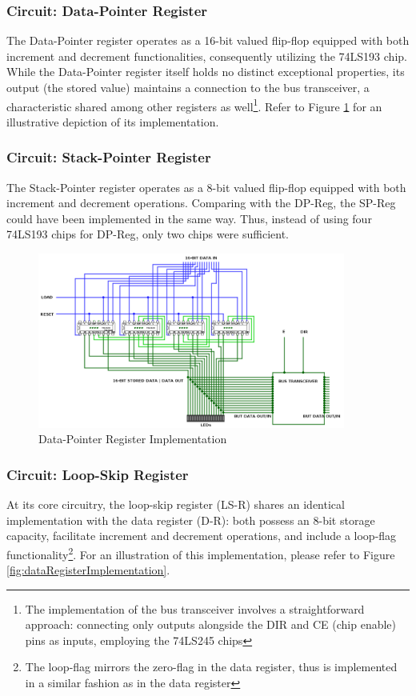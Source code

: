 \subsubsection{Circuit: Data-Pointer Register} \label{sec:implementation:registers:dpreg}
The Data-Pointer register operates as a 16-bit valued flip-flop equipped with both increment and decrement functionalities, consequently utilizing the 74LS193 chip. While the Data-Pointer register itself holds no distinct exceptional properties, its output (the stored value) maintains a connection to the bus transceiver, a characteristic shared among other registers as well\footnote{The implementation of the bus transceiver involves a straightforward approach: connecting only outputs alongside the DIR and CE (chip enable) pins as inputs, employing the 74LS245 chips}. Refer to Figure \ref{fig:dataPointerRegisterImplementation} for an illustrative depiction of its implementation.

\subsubsection{Circuit: Stack-Pointer Register} \label{sec:implementation:registers:spreg}
The Stack-Pointer register operates as a 8-bit valued flip-flop equipped with both increment and decrement operations. Comparing with the DP-Reg, the SP-Reg could have been implemented in the same way. Thus, instead of using four 74LS193 chips for DP-Reg, only two chips were sufficient. 


\begin{figure}[H]
	\centering
	\includegraphics[width=0.9\textwidth]{img/data_pointer_register_implementation}
	\caption{Data-Pointer Register Implementation}
	\label{fig:dataPointerRegisterImplementation}
\end{figure}

\subsubsection{Circuit: Loop-Skip Register} \label{sec:implementation:registers:loop_skip}
At its core circuitry, the loop-skip register (LS-R) shares an identical implementation with the data register (D-R): both possess an 8-bit storage capacity, facilitate increment and decrement operations, and include a loop-flag functionality\footnote{The loop-flag mirrors the zero-flag in the data register, thus is implemented in a similar fashion as in the data register}. For an illustration of this implementation, please refer to Figure \ref{fig:dataRegisterImplementation}.


